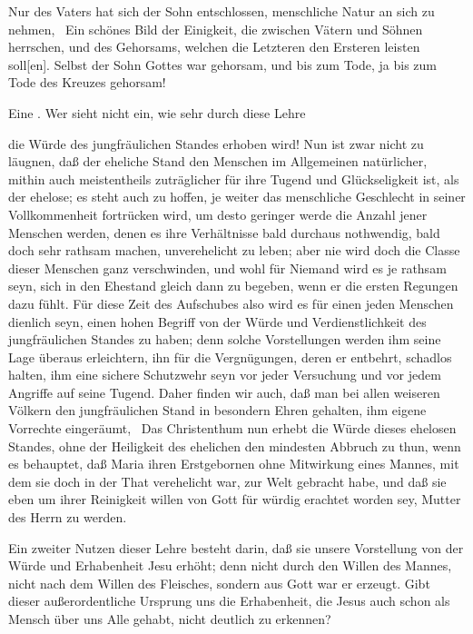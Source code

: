 \begin{aufza}
\item Nur  des Vaters hat sich der Sohn entschlossen, menschliche Natur an sich zu nehmen, \usw\ Ein schönes Bild der Einigkeit, die zwischen Vätern und Söhnen herrschen, und des Gehorsams, welchen die Letzteren den Ersteren leisten soll[en]. Selbst der Sohn Gottes war gehorsam, und bis zum Tode, ja bis zum Tode des Kreuzes gehorsam!
\item Eine . Wer sieht nicht ein, wie sehr durch diese Lehre
\begin{aufzb}
\item die Würde des jungfräulichen Standes erhoben wird! Nun ist zwar nicht zu läugnen, daß der eheliche Stand den Menschen im Allgemeinen natürlicher, mithin auch meistentheils zuträglicher für ihre Tugend und Glückseligkeit ist, als der ehelose; es steht auch zu hoffen, je weiter das menschliche Geschlecht in seiner Vollkommenheit fortrücken wird, um desto geringer werde die Anzahl jener Menschen werden, denen es ihre Verhältnisse bald durchaus nothwendig, bald doch sehr rathsam machen, unverehelicht zu leben; aber nie wird doch die Classe dieser Menschen ganz verschwinden, und wohl für Niemand wird es je rathsam seyn, sich in den Ehestand gleich dann zu begeben, wenn er die ersten Regungen dazu fühlt. Für diese Zeit des Aufschubes also wird es für einen jeden Menschen dienlich seyn, einen hohen Begriff von der Würde und Verdienstlichkeit des jungfräulichen Standes zu haben; denn solche Vorstellungen werden ihm seine Lage überaus erleichtern, ihn für die Vergnügungen, deren er entbehrt, schadlos halten, ihm eine sichere Schutzwehr seyn vor jeder Versuchung und vor jedem Angriffe auf seine Tugend. Daher finden wir auch, daß man bei allen weiseren Völkern den jungfräulichen Stand in besondern Ehren gehalten, ihm eigene Vorrechte eingeräumt, \udgl\  Das Christenthum nun erhebt die Würde dieses ehelosen Standes, ohne der Heiligkeit des ehelichen den mindesten Abbruch zu thun, wenn es behauptet, daß Maria ihren Erstgebornen ohne Mitwirkung eines Mannes, mit dem sie doch in der That verehelicht war, zur Welt gebracht habe, und daß sie eben um ihrer Reinigkeit willen von Gott für würdig erachtet worden sey, Mutter des Herrn zu werden.
\item Ein zweiter Nutzen dieser Lehre besteht darin, daß sie unsere Vorstellung von der Würde und Erhabenheit Jesu erhöht; denn nicht durch den Willen des Mannes, nicht nach dem Willen des Fleisches, sondern aus Gott war er erzeugt. Gibt dieser außerordentliche Ursprung uns die Erhabenheit, die Jesus auch schon als Mensch über uns Alle gehabt, nicht deutlich zu erkennen?

\end{aufzb}
\end{aufza}
